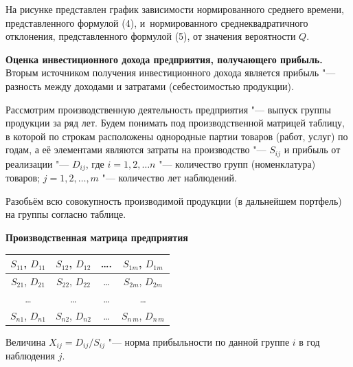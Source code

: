 На рисунке представлен график зависимости нормированного среднего времени,
представленного формулой (4), и~нормированного среднеквадратичного
отклонения, представленного формулой (5), от значения вероятности $Q$.



{\bf Оценка инвестиционного дохода предприятия, получающего прибыль.} Вторым
источником получения инвестиционного дохода является прибыль "--- разность
между доходами и затратами (себестоимостью продукции).

Рассмотрим производственную деятельность предприятия "--- выпуск группы
продукции за ряд лет.
Будем понимать под производственной матрицей таблицу, в которой по строкам расположены
однородные партии товаров (работ, услуг) по годам, а её элементами являются затраты на производство "---
$S_{ij} $ и прибыль от реализации "--- $D_{ij} $, где $i=1, 2, \dots n $ "--- количество
групп (номенклатура) товаров; $j=1, 2, \dots, m $ "--- количество лет
наблюдений.

Разобьём всю совокупность производимой продукции (в дальнейшем портфель) на группы согласно таблице.

\begin{table}[htbp]
\begin{center}
{\bf Производственная матрица предприятия}
\begin{tabular}{c|c|c|c}
\hline
$S_{11}$, $D_{11} $&
$S_{12}$, $D_{12} $&
{\ldots}.&
$S_{1m}$, $D_{1m} $ \\
\hline
$S_{21}$, $D_{21} $&
$S_{22}$, $D_{22} $&
\ldots &
$S_{2m}$, $D_{2m} $ \\
\hline
\ldots&
\ldots&
\ldots&
\ldots\\
\hline
$S_{n1}$, $D_{n1} $&
$S_{n2}$, $D_{n2} $&
\ldots&
$S_{n\,m}$, $D_{n\,m} $ \\
\hline
\end{tabular}
\end{center}
\end{table}

Величина $X_{ij} =D_{ij}/S_{ij} $ "--- норма прибыльности по данной группе $i$ в год наблюдения $j$.

